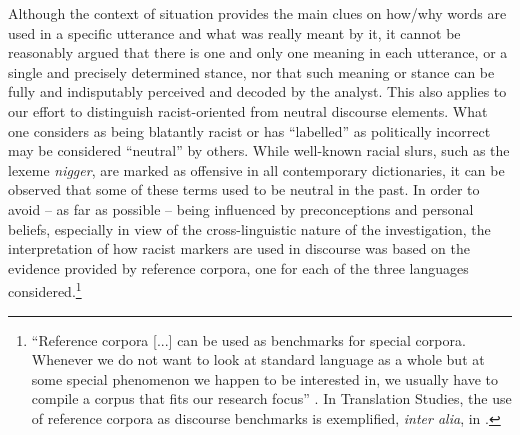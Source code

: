\documentclass[output=paper]{LSP/langsci}
\begin{document}
Although the context of situation provides the main clues on how/why words are used in a specific utterance and what was really meant by it, it cannot be reasonably argued that there is one and only one meaning in each utterance, or a single and precisely determined stance, nor that such meaning or stance can be fully and indisputably perceived and decoded by the analyst. This also applies to our effort to distinguish racist-oriented from neutral discourse elements. What one considers as being blatantly racist or has “labelled” as politically incorrect may be considered “neutral” by others. While well-known racial slurs, such as the lexeme \textit{nigger}, are marked as offensive in all contemporary dictionaries, it can be observed that some of these terms used to be neutral in the past. In order to avoid -- as far as possible -- being influenced by preconceptions and personal beliefs, especially in view of the cross-linguistic nature of the investigation, the interpretation of how racist markers are used in discourse was based on the evidence provided by reference corpora, one for each of the three languages considered.\footnote{“Reference corpora [...] can be used as benchmarks for special corpora. Whenever we do not want to look at standard language as a whole but at some special phenomenon we happen to be interested in, we usually have to compile a corpus that fits our research focus” \citep[68]{Teubert2007}. In Translation Studies, the use of reference corpora as discourse benchmarks is exemplified, \textit{inter alia}, in \citet[516]{Kenny1998}.}
\end{document}

